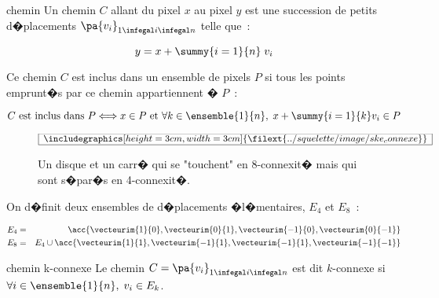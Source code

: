         \begin{xdefinition}{chemin}
        Un chemin $C$ allant du pixel $x$ au pixel $y$ est une succession de petits d�placements 
        $\pa{v_i}_{1 \infegal i \infegal n}$ telle que~:
        
                $$
                y = x + \summy{i=1}{n} \; v_i
                $$
                
        Ce chemin $C$ est inclus dans un ensemble de pixels $P$ si tous les points emprunt�s par 
        ce chemin appartiennent � $P$~:
        
                $$
                C \text{ est inclus dans } P \Longleftrightarrow     x \in P \text{ et } 
                                                                                                                    \forall k \in \ensemble{1}{n}, \; 
                                                                                                                    x + \summy{i=1}{k} v_i \in P
                $$
                
        \end{xdefinition}


            \begin{figure}[ht]
        $$\frame{$\begin{array}[c]{c}\includegraphics[height=3cm, width=3cm]
        {\filext{../squelette/image/ske_connexe}}\end{array}$}$$
        \caption{    Un disque et un carr� qui se "touchent" en 8-connexit� mais qui sont s�par�s en 4-connexit�.}
        \label{squelette_connexe48}
            \end{figure}


On d�finit deux ensembles de d�placements �l�mentaires, $E_4$ et $E_8$~:

        \begin{eqnarray*}
        E_4     &=&        \acc{ \vecteurim{1}{0}, \vecteurim{0}{1}, \vecteurim{-1}{0}, \vecteurim{0}{-1}   } \\
        E_8     &=&        E_4 \cup \acc{ \vecteurim{1}{1}, \vecteurim{-1}{1}, \vecteurim{-1}{1}, \vecteurim{-1}{-1}   } 
        \end{eqnarray*}


        \begin{xdefinition}{chemin k-connexe}
        Le chemin $C= \pa{v_i}_{1 \infegal i \infegal n}$ est dit $k$-connexe 
        si $\forall i \in \ensemble{1}{n}, \; v_i \in E_k$. 
        \end{xdefinition}

